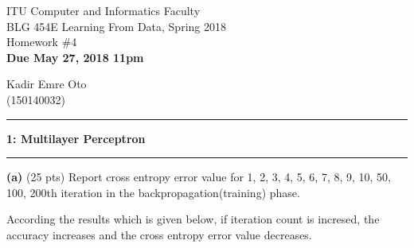 \documentclass[11pt]{article}
\newcommand\question[2]{\vspace{.25in}\hrule\textbf{#1: #2}\vspace{.5em}\hrule\vspace{.10in}}
\renewcommand\part[1]{\vspace{.10in}\textbf{(#1)}}
\newcommand\header[4]{\begin{center}{#1} \\ {#2} \\ {#3} \\ \textbf{#4} \end{center}}
\begin{document}
\raggedright

\header
	{ITU Computer and Informatics Faculty}
	{BLG 454E Learning From Data, Spring 2018}
	{Homework \#4}
	{Due May 27, 2018 11pm}

\begin{center}
	Kadir Emre Oto \\
	(150140032)
\end{center}

\question{1}{Multilayer Perceptron}

\part{a} (25 pts) Report cross entropy error value for 1, 2, 3, 4, 5, 6, 7, 8, 9, 10, 50, 100, 200th iteration in the backpropagation(training) phase.

According the results which is given below, if iteration count is incresed, the accuracy increases and the cross entropy error value decreases.
\end{document}
